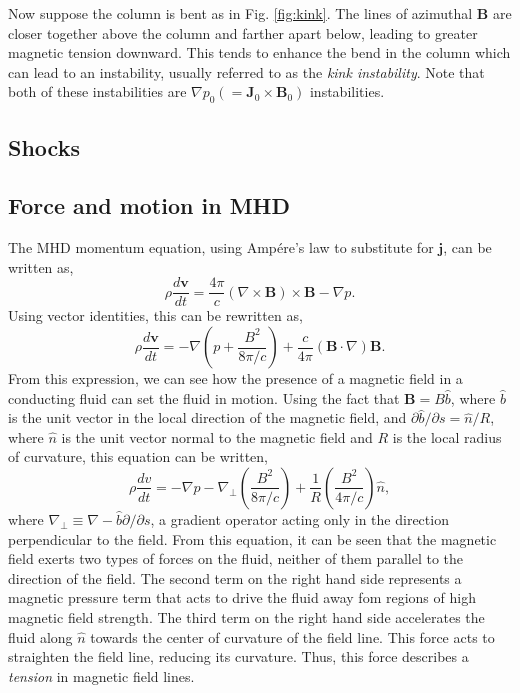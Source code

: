 	Now suppose the column is bent as in Fig. \ref{fig:kink}. The lines of azimuthal $\mathbf{B}$ are closer together above the column and farther apart below, leading to greater magnetic tension downward. This tends to enhance the bend in the column which can lead to an instability, usually referred to as the \textit{kink instability}. Note that both of these instabilities are $\nabla p_0 (=\mathbf{J}_0\times\mathbf{B}_0)$ instabilities.

	\subsection{Shocks}

	\subsection{Force and motion in MHD}
	The MHD momentum equation, using Amp\'ere's law to substitute for $\mathbf{j}$, can be written as,
	\begin{equation}
		\rho\frac{d\mathbf{v}}{dt} = \frac{4\pi}{c}(\nabla\times\mathbf{B})\times\mathbf{B} - \nabla p.
	\end{equation}
	Using vector identities, this can be rewritten as,
	\begin{equation}
		\rho\frac{d\mathbf{v}}{dt} = -\nabla\left(p + \frac{B^2}{8\pi/c}\right) + \frac{c}{4\pi}(\mathbf{B}\cdot\nabla)\mathbf{B}.
	\end{equation}
	From this expression, we can see how the presence of a magnetic field in a conducting fluid can set the fluid in motion. Using the fact that $\mathbf{B}=B\hat{b}$, where $\hat{b}$ is the unit vector in the local direction of the magnetic field, and $\partial\hat{b}/\partial s=\hat{n}/R$, where $\hat{n}$ is the unit vector normal to the magnetic field and $R$ is the local radius of curvature, this equation can be written,
	\begin{equation}
		\rho\frac{dv}{dt} = -\nabla p - \nabla_{\perp}\left(\frac{B^2}{8\pi/c}\right) + \frac{1}{R}\left(\frac{B^2}{4\pi/c}\right)\hat{n},
	\end{equation}
	where $\nabla_{\perp}\equiv\nabla - \hat{b}\partial/\partial s$, a gradient operator acting only in the direction perpendicular to the field. From this equation, it can be seen that the magnetic field exerts two types of forces on the fluid, neither of them parallel to the direction of the field. The second term on the right hand side represents a magnetic pressure term that acts to drive the fluid away fom regions of high magnetic field strength. The third term on the right hand side accelerates the fluid along $\hat{n}$ towards the center of curvature of the field line. This force acts to straighten the field line, reducing its curvature. Thus, this force describes a \textit{tension} in magnetic field lines. 

